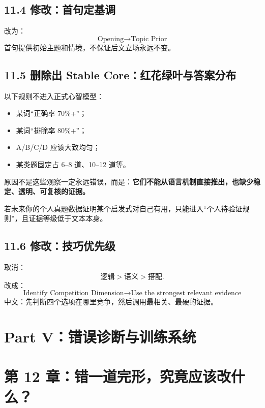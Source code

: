 \documentclass[11pt,a4paper]{ctexart}
\newcommand{\kw}[1]{\textbf{#1}}
\begin{document}
\subsection{11.4 修改：首句定基调}
改为：
\[
\boxed{\text{Opening}\rightarrow\text{Topic Prior}}
\]
首句提供初始主题和情境，不保证后文立场永远不变。

\subsection{11.5 删除出 Stable Core：红花绿叶与答案分布}
以下规则不进入正式心智模型：
\begin{itemize}
  \item 某词“正确率 70\%+”；
  \item 某词“排除率 80\%+”；
  \item A/B/C/D 应该大致均匀；
  \item 某类题固定占 6--8 道、10--12 道等。
\end{itemize}
原因不是这些观察一定永远错误，而是：\kw{它们不能从语言机制直接推出，也缺少稳定、透明、可复核的证据。}

若未来你的个人真题数据证明某个启发式对自己有用，只能进入“个人待验证规则”，且证据等级低于文本本身。

\subsection{11.6 修改：技巧优先级}
取消：
\[
\text{逻辑}>\text{语义}>\text{搭配}.
\]
改成：
\[
\boxed{
\text{Identify Competition Dimension}
\rightarrow
\text{Use the strongest relevant evidence}
}
\]
中文：先判断四个选项在哪里竞争，然后调用最相关、最硬的证据。

\newpage
\section{Part V：错误诊断与训练系统}

\section{第 12 章：错一道完形，究竟应该改什么？}
\end{document}
